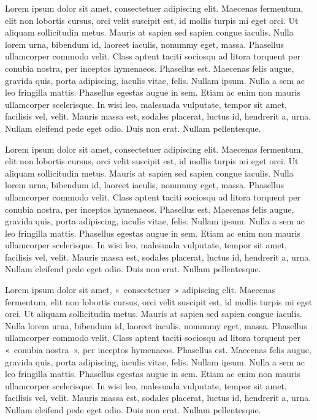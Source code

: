 Lorem ipsum dolor sit amet, consectetuer adipiscing elit. Maecenas fermentum, elit non lobortis cursus, orci velit suscipit est, id mollis turpis mi eget orci. Ut aliquam sollicitudin metus. Mauris at sapien sed sapien congue iaculis. Nulla lorem urna, bibendum id, laoreet iaculis, nonummy eget, massa. Phasellus ullamcorper commodo velit. Class aptent taciti sociosqu ad litora torquent per conubia nostra, per inceptos hymenaeos. Phasellus est. Maecenas felis augue, gravida quis, porta adipiscing, iaculis vitae, felis. Nullam ipsum. Nulla a sem ac leo fringilla mattis. Phasellus egestas augue in sem. Etiam ac enim non mauris ullamcorper scelerisque. In wisi leo, malesuada vulputate, tempor sit amet, facilisis vel, velit. Mauris massa est, sodales placerat, luctus id, hendrerit a, urna. Nullam eleifend pede eget odio. Duis non erat. Nullam pellentesque.

Lorem ipsum dolor sit amet, consectetuer adipiscing elit. Maecenas fermentum, elit non lobortis cursus, orci velit suscipit est, id mollis turpis mi eget orci. Ut aliquam sollicitudin metus. Mauris at sapien sed sapien congue iaculis. Nulla lorem urna, bibendum id, laoreet iaculis, nonummy eget, massa. Phasellus ullamcorper commodo velit. Class aptent taciti sociosqu ad litora torquent per conubia nostra, per inceptos hymenaeos. Phasellus est. Maecenas felis augue, gravida quis, porta adipiscing, iaculis vitae, felis. Nullam ipsum. Nulla a sem ac leo fringilla mattis. Phasellus egestas augue in sem. Etiam ac enim non mauris ullamcorper scelerisque. In wisi leo, malesuada vulputate, tempor sit amet, facilisis vel, velit. Mauris massa est, sodales placerat, luctus id, hendrerit a, urna. Nullam eleifend pede eget odio. Duis non erat. Nullam pellentesque.

Lorem ipsum dolor sit amet, «~consectetuer~» adipiscing elit. Maecenas fermentum, elit non lobortis cursus, orci velit suscipit est, id mollis turpis mi eget orci. Ut aliquam sollicitudin metus. Mauris at sapien sed sapien congue iaculis. Nulla lorem urna, bibendum id, laoreet iaculis, nonummy eget, massa. Phasellus ullamcorper commodo velit. Class aptent taciti sociosqu ad litora torquent per «~conubia nostra~», per inceptos hymenaeos. Phasellus est. Maecenas felis augue, gravida quis, porta adipiscing, iaculis vitae, felis. Nullam ipsum. Nulla a sem ac leo fringilla mattis. Phasellus egestas augue in sem. Etiam ac enim non mauris ullamcorper scelerisque. In wisi leo, malesuada vulputate, tempor sit amet, facilisis vel, velit. Mauris massa est, sodales placerat, luctus id, hendrerit a, urna. Nullam eleifend pede eget odio. Duis non erat. Nullam pellentesque.

